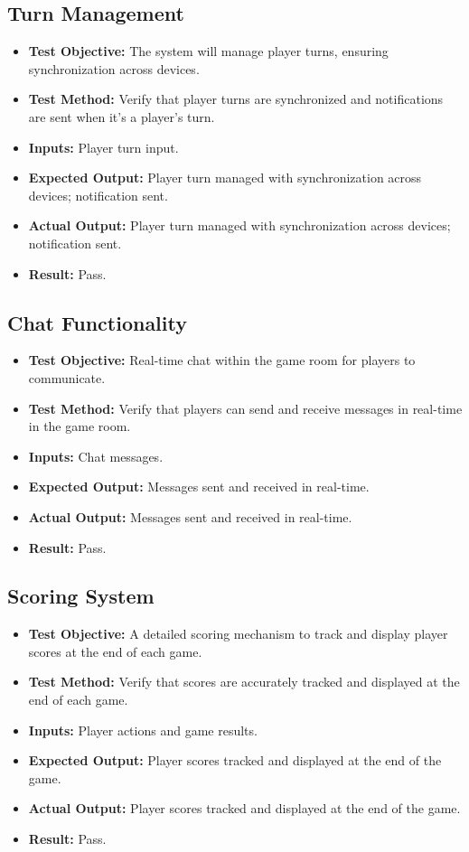 \documentclass[12pt, titlepage]{article}
\begin{document}
\subsection{Turn Management}
\begin{itemize}
    \item \textbf{Test Objective:} The system will manage player turns, ensuring synchronization across devices.
    \item \textbf{Test Method:} Verify that player turns are synchronized and notifications are sent when it's a player's turn.
    \item \textbf{Inputs:} Player turn input.
    \item \textbf{Expected Output:} Player turn managed with synchronization across devices; notification sent.
    \item \textbf{Actual Output:} Player turn managed with synchronization across devices; notification sent.
    \item \textbf{Result:} Pass.
\end{itemize}

\subsection{Chat Functionality}
\begin{itemize}
    \item \textbf{Test Objective:} Real-time chat within the game room for players to communicate.
    \item \textbf{Test Method:} Verify that players can send and receive messages in real-time in the game room.
    \item \textbf{Inputs:} Chat messages.
    \item \textbf{Expected Output:} Messages sent and received in real-time.
    \item \textbf{Actual Output:} Messages sent and received in real-time.
    \item \textbf{Result:} Pass.
\end{itemize}

\subsection{Scoring System}
\begin{itemize}
    \item \textbf{Test Objective:} A detailed scoring mechanism to track and display player scores at the end of each game.
    \item \textbf{Test Method:} Verify that scores are accurately tracked and displayed at the end of each game.
    \item \textbf{Inputs:} Player actions and game results.
    \item \textbf{Expected Output:} Player scores tracked and displayed at the end of the game.
    \item \textbf{Actual Output:} Player scores tracked and displayed at the end of the game.
    \item \textbf{Result:} Pass.
\end{itemize}
\end{document}
